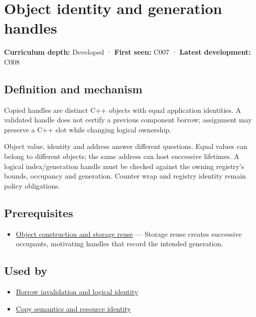 \hypertarget{appendix-f1581457d322}{}\label{referencestart:appendix-f1581457d322}
\section{Object identity and generation handles}\label{appendix-f1581457d322-object-identity-and-generation-handles}

\textbf{Curriculum depth:} Developed · \textbf{First seen:} C007 · \textbf{Latest development:} C008

\subsection{Definition and mechanism}\label{appendix-f1581457d322-definition-and-mechanism}

Copied handles are distinct C++ objects with equal application identities. A validated handle does not certify a previous component borrow; assignment may preserve a C++ slot while changing logical ownership.

Object value, identity and address answer different questions. Equal values can belong to different objects; the same address can host successive lifetimes. A logical index/generation handle must be checked against the owning registry's bounds, occupancy and generation. Counter wrap and registry identity remain policy obligations.

\subsection{Prerequisites}\label{appendix-f1581457d322-prerequisites}

\begin{itemize}
\tightlist
\item
  \hyperref[appendix-a82f9c438857]{Object construction and storage reuse} --- Storage reuse creates successive occupants, motivating handles that record the intended generation.
\end{itemize}

\subsection{Used by}\label{appendix-f1581457d322-used-by}

\begin{itemize}
\tightlist
\item
  \hyperref[appendix-f9b8b9188c7f]{Borrow invalidation and logical identity}
\item
  \hyperref[appendix-1340cd1ce582]{Copy semantics and resource identity}
\end{itemize}


